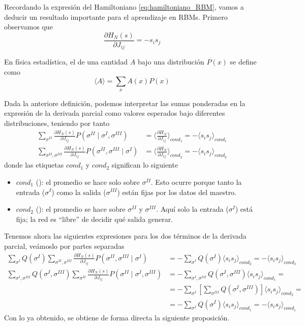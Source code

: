 \noindent
Recordando la expresión del Hamiltoniano \eqref{eq:hamiltoniano_RBM}, vamos a deducir un resultado importante para el aprendizaje en RBMs. Primero observamos que
\begin{equation*}
    \frac{\partial H_N(s)}{\partial J_{ij}} = -s_i s_j 
\end{equation*}
\begin{definicion}
    En física estadística, el  de una cantidad $A$ bajo una distribución $P(x)$ se define como
    \begin{equation*}
        \langle A \rangle = \sum_x A(x) P(x)
    \end{equation*}
\end{definicion}
\noindent
Dada la anteriore definición, podemos interpretar las sumas ponderadas en la expresión de la derivada parcial como valores esperados bajo diferentes distribuciones, teniendo por tanto
\begin{align*}
    \sum_{\sigma^{II}} \frac{\partial H_N(s)}{\partial J_{ij}}  P(\sigma^{II} \mid \sigma^I, \sigma^{III})&= \langle \frac{\partial H_N}{\partial J_{ij}} \rangle_{cond_1} =-\langle s_i s_j\rangle_{cond_1} \\
    \sum_{\sigma^{II}, \sigma^{III}} \frac{\partial H_N(s)}{\partial J_{ij}}  P(\sigma^{II}, \sigma^{III} \mid \sigma^I)&= \langle \frac{\partial H_N}{\partial J_{ij}} \rangle_{cond_2}=-\langle s_i s_j\rangle_{cond_2}
\end{align*}
donde las etiquetas $cond_1$ y $cond_2$ significan lo siguiente 
\begin{itemize}
    \item $cond_1$ (): el promedio se hace solo sobre $\sigma^{II}$. Esto ocurre porque tanto la entrada ($\sigma^I$) como la salida ($\sigma^{III}$) están fijas por los datos del maestro.
    \item $cond_2$ (): el promedio se hace sobre $\sigma^{II}$ y $\sigma^{III}$. Aquí solo la entrada ($\sigma^I$) está fija; la red es ``libre'' de decidir qué salida generar.
\end{itemize}
\noindent
Tenemos ahora las siguientes expresiones para los dos términos de la derivada parcial, veámoslo por partes separadas
\begin{align*}
    \sum_{\sigma^I} Q(\sigma^I) \sum_{\sigma^{II}, \sigma^{III}} \frac{\partial H_N(s)}{\partial J_{ij}}  P(\sigma^{II}, \sigma^{III} \mid \sigma^I) &= -\sum_{\sigma^I} Q(\sigma^I) \langle s_i s_j \rangle_{cond_2}=-\langle s_i s_j \rangle_{cond_2} \\
    \sum_{\sigma^I, \sigma^{III}} Q(\sigma^I, \sigma^{III}) \sum_{\sigma^{II}} \frac{\partial H_N(s)}{\partial J_{ij}}  P(\sigma^{II} \mid \sigma^I, \sigma^{III}) &= -\sum_{\sigma^I, \sigma^{III}} Q(\sigma^I, \sigma^{III}) \langle s_i s_j \rangle_{cond_1}=\\
    &= - \sum_{\sigma^I} \left[ \sum_{\sigma^{III}} Q(\sigma^I, \sigma^{III}) \right] \langle s_i s_j \rangle_{cond_2}=\\
    &=-\sum_{\sigma^I} Q(\sigma^I) \langle s_i s_j \rangle_{cond_1} = -\langle s_i s_j \rangle_{cond_1} 
\end{align*}
Con lo ya obtenido, se obtiene de forma directa la siguiente proposición.

